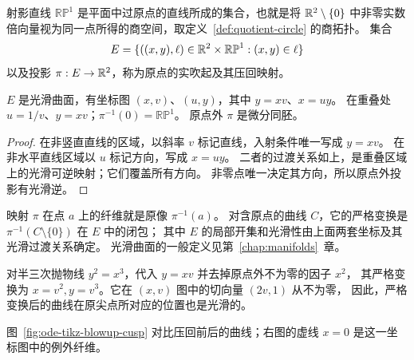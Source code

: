 \begin{definition}[平面的实吹起]
射影直线 $\mathbb{RP}^1$ 是平面中过原点的直线所成的集合，也就是将 $\mathbb{R}^2\setminus\{0\}$ 中非零实数倍向量视为同一点所得的商空间，取定义~\ref{def:quotient-circle} 的商拓扑。
集合
\[
 E=\{((x,y),\ell)\in\mathbb{R}^2\times\mathbb{RP}^1:(x,y)\in\ell\}
\]
以及投影 $\pi:E\to\mathbb{R}^2$，称为原点的实吹起及其压回映射。
\end{definition}
\begin{proposition}
$E$ 是光滑曲面，有坐标图 $(x,v)$、$(u,y)$，其中 $y=xv$、$x=uy$。
在重叠处 $u=1/v$、$y=xv$；$\pi^{-1}(0)=\mathbb{RP}^1$。
原点外 $\pi$ 是微分同胚。
\end{proposition}
\begin{proof}
在非竖直直线的区域，以斜率 $v$ 标记直线，入射条件唯一写成 $y=xv$。
在非水平直线区域以 $u$ 标记方向，写成 $x=uy$。
二者的过渡关系如上，是重叠区域上的光滑可逆映射；它们覆盖所有方向。
非零点唯一决定其方向，所以原点外投影有光滑逆。
\end{proof}

\begin{definition}[吹起中的纤维与严格变换]
映射 $\pi$ 在点 $a$ 上的纤维就是原像 $\pi^{-1}(a)$。
对含原点的曲线 $C$，它的严格变换是 $\pi^{-1}(C\setminus\{0\})$ 在 $E$ 中的闭包；
其中 $E$ 的局部开集和光滑性由上面两套坐标及其光滑过渡关系确定。
光滑曲面的一般定义见第~\ref{chap:manifolds}~章。
\end{definition}

对半三次抛物线 $y^2=x^3$，代入 $y=xv$ 并去掉原点外不为零的因子 $x^2$，
其严格变换为 $x=v^2,y=v^3$。它在 $(x,v)$ 图中的切向量 $(2v,1)$ 从不为零，
因此，严格变换后的曲线在原尖点所对应的位置也是光滑的。


图~\ref{fig:ode-tikz-blowup-cusp} 对比压回前后的曲线；右图的虚线 $x=0$ 是这一坐标图中的例外纤维。
\begin{center}
\begin{minipage}{0.96\linewidth}
\centering
\label{fig:ode-tikz-blowup-cusp}
\end{minipage}
\end{center}

